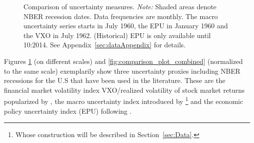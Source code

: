 \documentclass[a4paper,11pt,listof=nochaptergap,oneside,pointednumbers,bibtotoc,bigheadings,liststotoc,hidelinks]{scrbook}
\theoremstyle{mysatz}
\theoremstyle{mydefinition}
\theoremstyle{mytheorem}
\theoremstyle{mybemerkung}
\begin{document}
\begin{figure}[!ht]
   \centering
   \setlength\fboxsep{0pt}
   \setlength\fboxrule{0pt}
      \caption[Comparison of uncertainty measures.]{Comparison of uncertainty measures.
      \textit{Note:} Shaded areas denote NBER recession dates. Data frequencies are monthly. The macro uncertainty series starts in July 1960, the EPU in January 1960 and the VXO in July 1962. (Historical) EPU is only available until 10:2014. See Appendix~\ref{sec:dataAppendix} for details.}   \label{fig:comparison_plot}
\end{figure}

Figures \ref{fig:comparison_plot} (on different scales) and \ref{fig:comparison_plot_combined} (normalized to the same scale) exemplarily show three uncertainty proxies including NBER recessions for the U.S that have been used in the literature. These are the financial market volatility index VXO/realized volatility of stock market returns popularized by \citet{bloom:09}, the macro uncertainty index introduced by \citet{juradoetal:15}\footnote{Whose construction will be described in Section~\ref{sec:Data}.} and the economic policy uncertainty index (EPU) following \citet{bakeretal:15}.
\end{document}
